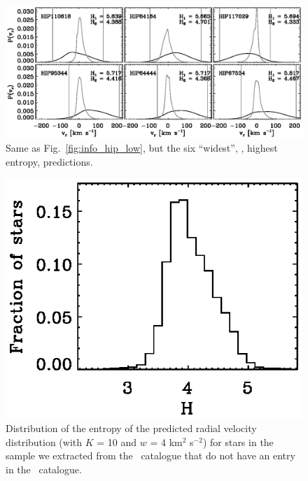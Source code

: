 \clearpage
\begin{figure}
\includegraphics{info_hip_high.ps}
\caption{Same as Fig.~\ref{fig:info_hip_low}, but the six ``widest'', \ie, highest entropy, predictions.}%
\label{fig:info_hip_high}
\end{figure}


\clearpage
\begin{figure}
\includegraphics{hist_hip_ent.ps}
\caption{Distribution of the entropy of the predicted radial velocity distribution (with $K$ = 10 and $w$ = 4 km$^2$ s$^{-2}$) for stars in the sample we extracted from the \Hipparcos\ catalogue that do not have an entry in the \gcsabb\ catalogue.}%
\label{fig:hist_hip_ent}
\end{figure}


